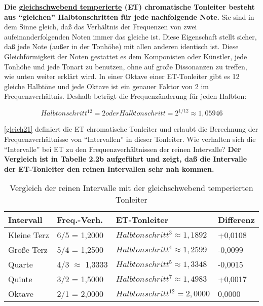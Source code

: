 \label{et1}

\textbf{Die \hyperref[et]{gleichschwebend temperierte} (ET) chromatische Tonleiter besteht aus \enquote{gleichen} Halbtonschritten für jede nachfolgende Note.}
Sie sind in dem Sinne gleich, daß das Verhältnis der Frequenzen von zwei aufeinanderfolgenden Noten immer das gleiche ist.
Diese Eigenschaft stellt sicher, daß jede Note (außer in der Tonhöhe) mit allen anderen identisch ist.
Diese Gleichförmigkeit der Noten gestattet es dem Komponisten oder Künstler, jede Tonhöhe und jede Tonart zu benutzen, ohne auf große Dissonanzen zu treffen, wie unten weiter erklärt wird.
In einer Oktave einer ET-Tonleiter gibt es 12 gleiche Halbtöne und jede Oktave ist ein genauer Faktor von 2 im Frequenzverhältnis.
Deshalb beträgt die Frequenzänderung für jeden Halbton:


\begin{equation}
 \label{gleich21}
 Halbtonschritt^{12} = 2 oder Halbtonschritt = 2^{1/12} \approx 1,05946
\end{equation}

\autoref{gleich21} definiert die ET chromatische Tonleiter und erlaubt die Berechnung der Frequenzverhältnisse von \enquote{Intervallen} in dieser Tonleiter.
Wie verhalten sich die \enquote{Intervalle} bei ET zu den Frequenzverhältnissen der reinen Intervalle?
\textbf{Der Vergleich ist in Tabelle 2.2b aufgeführt und zeigt, daß die Intervalle der ET-Tonleiter den reinen Intervallen sehr nah kommen.}

\begin{table}
 \caption{Vergleich der reinen Intervalle mit der gleichschwebend temperierten Tonleiter}
 \begin{tabular}{l|l|l|l}
 \label{tab:templeiter}
 \textbf{Intervall} & \textbf{Freq.-Verh.} & \textbf{ET-Tonleiter} & \textbf{Differenz} \\
 \hline
 Kleine Terz & 6/5 = 1,2000 & $Halbtonschritt^3 \approx 1,1892$ & +0,0108 \\
 Große Terz & 5/4 = 1,2500 & $Halbtonschritt^4 \approx 1,2599$ & -0,0099 \\
 Quarte & 4/3 $\approx$ 1,3333 & $Halbtonschritt^5 \approx 1,3348$ & -0,0015 \\
 Quinte & 3/2 = 1,5000 & $Halbtonschritt^7 \approx 1,4983$ & +0,0017 \\
 Oktave & 2/1 = 2,0000 & $Halbtonschritt^{12} = 2,0000$ & 0,0000 \\
 \end{tabular}
\end{table}

